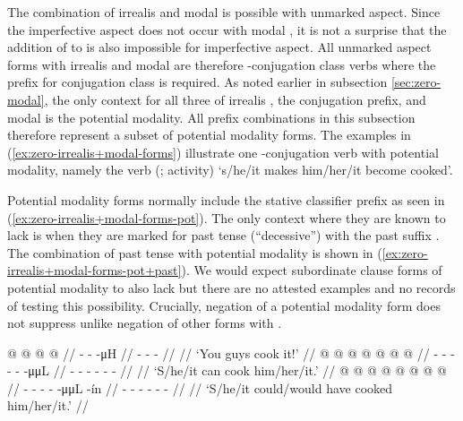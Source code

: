 \begin{multicols}{2}
\noindent
The combination of irrealis  and modal  is possible with unmarked aspect.
Since the imperfective aspect does not occur with modal , it is not a surprise that the addition of  to  is also impossible for imperfective aspect.
All unmarked aspect forms with irrealis  and modal  are therefore -conjugation class verbs where the prefix for conjugation class is required.
As noted earlier in subsection \ref{sec:zero-modal}, the only context for all three of irrealis , the  conjugation prefix, and modal  is the potential modality.
All prefix combinations in this subsection therefore represent a subset of potential modality forms.
The examples in (\ref{ex:zero-irrealis+modal-forms}) illustrate one -conjugation verb with potential modality, namely the verb  (;  activity) ‘s/he/it makes him/her/it become cooked’.

Potential modality forms normally include the stative  classifier prefix as seen in (\ref{ex:zero-irrealis+modal-forms-pot}).
The only context where they are known to lack  is when they are marked for past tense (“decessive”) with the past suffix .
The combination of past tense with potential modality is shown in (\ref{ex:zero-irrealis+modal-forms-pot+past}).
We would expect subordinate clause forms of potential modality to also lack  but there are no attested examples and no records of testing this possibility.
Crucially, negation of a potential modality form does not suppress  unlike negation of other forms with .

\pex\label{ex:zero-irrealis+modal-forms}%
\a\label{ex:zero-irrealis+modal-forms-imp}%
%
\begingl
	\gla	{} @ {} @ {} @ {} @ {} //
	\glb	{} - -  -μH //
	\glc	{}\· - -  - //
	\gld	{} {} {} {} {} //
	\glft	‘You guys cook it!’
		//
\endgl
\a\label{ex:zero-irrealis+modal-forms-pot}%
%
\begingl
	\gla	{} @ {} @ {} @ {} @ {} @ {} @ {} @ {} //
	\glb	{}- -  - - -  -μμL //
	\glc	{}- - \· - - -  - //
	\gld	{} {} {} {} {} {} {} //
	\glft	‘S/he/it can cook him/her/it.’
		//
\endgl
\a\label{ex:zero-irrealis+modal-forms-pot+past}%
%
\begingl
	\gla	{} @ {} @ {} @ {} @ {} @ {} @ {} @ {} @ {} //
	\glb	{}- -  - -   -μμL -ín //
	\glc	{}- - \· - -   - - //
	\gld	{} {} {} {} {} {} {} {} //
	\glft	‘S/he/it could/would have cooked him/her/it.’
		//
\endgl
\xe
\end{multicols}

